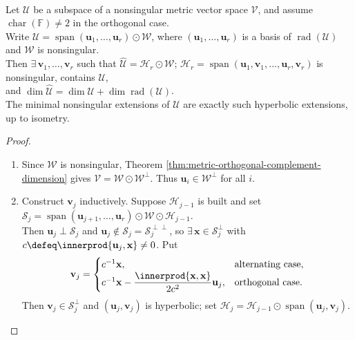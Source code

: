 \begin{theorem} \label{thm:nonsingular-completions-hyperbolic-extensions} \\
Let $\mathcal{U}$ be a subspace of a nonsingular metric vector space $\mathcal{V}$, and assume $\operatorname{char}(\mathbb{F})\neq2$ in the orthogonal case.\\
Write $\mathcal{U}=\operatorname{span}(\mathbf{u}_1,\ldots,\mathbf{u}_r)\odot\mathcal{W}$, where $(\mathbf{u}_1,\ldots,\mathbf{u}_r)$ is a basis of $\operatorname{rad}(\mathcal{U})$ and $\mathcal{W}$ is nonsingular.\\
Then $\exists\,\mathbf{v}_1,\ldots,\mathbf{v}_r$ such that $\widehat{\mathcal{U}} =\mathcal{H}_r\odot\mathcal{W}$; $\mathcal{H}_r=\operatorname{span}(\mathbf{u}_1,\mathbf{v}_1,\ldots,\mathbf{u}_r,\mathbf{v}_r)$ is nonsingular, contains $\mathcal{U}$,\\
and $\dim\widehat{\mathcal{U}}=\dim\mathcal{U}+\dim\operatorname{rad}(\mathcal{U})$.\\
The minimal nonsingular extensions of $\mathcal{U}$ are exactly such hyperbolic extensions, up to isometry.
\begin{proof}
\begin{enumerate}[label=(\roman*)]
\setlength{\itemsep}{0pt}
\item Since $\mathcal{W}$ is nonsingular, Theorem \ref{thm:metric-orthogonal-complement-dimension} gives $\mathcal{V}=\mathcal{W}\odot\mathcal{W}^{\perp}$. Thus $\mathbf{u}_i\in\mathcal{W}^{\perp}$ for all $i$.
\item Construct $\mathbf{v}_j$ inductively. Suppose $\mathcal{H}_{j-1}$ is built and set $\mathcal{S}_j=\operatorname{span}(\mathbf{u}_{j+1},\ldots,\mathbf{u}_r)\odot\mathcal{W}\odot\mathcal{H}_{j-1}$.\\
Then $\mathbf{u}_j\perp\mathcal{S}_j$ and $\mathbf{u}_j\notin\mathcal{S}_j=\mathcal{S}_j^{\perp\perp}$, so $\exists\,\mathbf{x}\in\mathcal{S}_j^{\perp}$ with $c\defeq\innerprod{\mathbf{u}_j,\mathbf{x}}\neq0$. Put
\begin{align}
\mathbf{v}_j=
\begin{cases}
c^{-1}\mathbf{x}, & \text{alternating case},\\
c^{-1}\mathbf{x}-\dfrac{\innerprod{\mathbf{x},\mathbf{x}}}{2c^2}\mathbf{u}_j, & \text{orthogonal case}.
\end{cases} \nonumber
\end{align}
Then $\mathbf{v}_j\in\mathcal{S}_j^{\perp}$ and $(\mathbf{u}_j,\mathbf{v}_j)$ is hyperbolic; set $\mathcal{H}_{j}=\mathcal{H}_{j-1}\odot\operatorname{span}(\mathbf{u}_j,\mathbf{v}_j)$.

\end{enumerate}
\end{proof}
\end{theorem}

